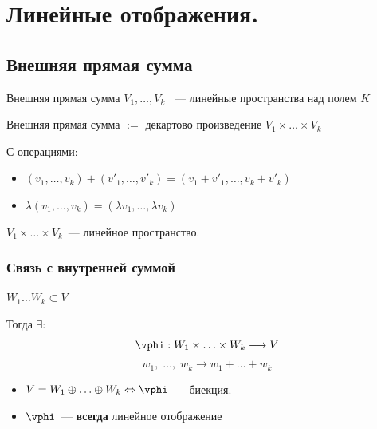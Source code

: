 

\section{Линейные отображения.}

\subsection{Внешняя прямая сумма}

\begin{Definition}{Внешняя прямая сумма}{}
    $ V_1, \ldots, V_k$ ~--- линейные пространства над полем $K$

    Внешняя прямая сумма $:=$ декартово произведение $V_1 \times \ldots \times V_k$

    С операциями:
    \begin{itemize}
        \item $(v_1 , \ldots , v_k) + (v'_1 , \ldots , v'_k) = (v_1 + v'_1 , \ldots , v_k + v'_k) $
        \item $ \lambda (v_1 , \ldots , v_k) = (\lambda v_1 , \ldots , \lambda v_k)$ 
    \end{itemize}
\end{Definition}

\begin{Statement}{}{}
    $V_1 \times \ldots \times V_k$~--- линейное пространство.
\end{Statement}


\subsubsection{Связь с внутренней суммой}

$W_1 \ldots W_k \subset V$

Тогда $\exists$:
\[
\vphi : W_1 \times \ldots \times W_k \longrightarrow V
\]
\[
w_1 , \; \ldots , \; w_k \rightarrow w_1 + \ldots + w_k
\]


\begin{Proposition}{}{}
    \begin{itemize}
        \item $ V = W_1 \oplus \ldots \oplus W_k \Leftrightarrow \vphi $~--- биекция.
        \item $ \vphi$~--- \textbf{всегда} линейное отображение
    \end{itemize}
\end{Proposition}

